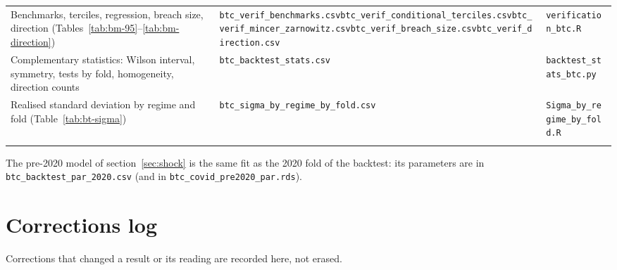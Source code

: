 \documentclass[12pt,a4paper]{article}
\begin{document}
\begin{table}[H]
\begin{tabular}{p{3.9cm}p{6.2cm}p{3.3cm}}
		\addlinespace
		Benchmarks, terciles, regression, breach size, direction (Tables~\ref{tab:bm-95}--\ref{tab:bm-direction}) & \texttt{btc\_\allowbreak{}verif\_\allowbreak{}benchmarks.csv}\newline \texttt{btc\_\allowbreak{}verif\_\allowbreak{}conditional\_\allowbreak{}terciles.csv}\newline \texttt{btc\_\allowbreak{}verif\_\allowbreak{}mincer\_\allowbreak{}zarnowitz.csv}\newline \texttt{btc\_\allowbreak{}verif\_\allowbreak{}breach\_\allowbreak{}size.csv}\newline \texttt{btc\_\allowbreak{}verif\_\allowbreak{}direction.csv} & \texttt{verification\_\allowbreak{}btc.R} \\
		\addlinespace
				Complementary statistics: Wilson interval, symmetry, tests by fold, homogeneity, direction counts & \texttt{btc\_\allowbreak{}backtest\_\allowbreak{}stats.csv} & \texttt{backtest\_\allowbreak{}stats\_\allowbreak{}btc.py} \\
		\addlinespace
		Realised standard deviation by regime and fold (Table~\ref{tab:bt-sigma}) & \texttt{btc\_\allowbreak{}sigma\_\allowbreak{}by\_\allowbreak{}regime\_\allowbreak{}by\_\allowbreak{}fold.csv} & \texttt{Sigma\_\allowbreak{}by\_\allowbreak{}regime\_\allowbreak{}by\_\allowbreak{}fold.R} \\
		\addlinespace
		\bottomrule
	\end{tabular}
\end{table}

The pre-2020 model of section~\ref{sec:shock} is the same fit as the 2020 fold of the backtest: its parameters are in \texttt{btc\_\allowbreak{}backtest\_\allowbreak{}par\_\allowbreak{}2020.csv} (and in \texttt{btc\_\allowbreak{}covid\_\allowbreak{}pre2020\_\allowbreak{}par.rds}).

\section{Corrections log}
\label{sec:app-log}

Corrections that changed a result or its reading are recorded here, not erased.
\end{document}

